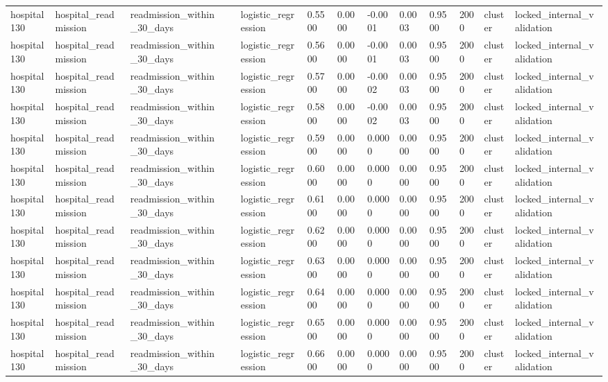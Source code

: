 \begin{tabular}{lllllllllllll}
hospital130 & hospital\_readmission & readmission\_within\_30\_days &  & logistic\_regression & 0.5500 & 0.0000 & -0.0001 & 0.0003 & 0.9500 & 2000 & cluster & locked\_internal\_validation \\
hospital130 & hospital\_readmission & readmission\_within\_30\_days &  & logistic\_regression & 0.5600 & 0.0000 & -0.0001 & 0.0003 & 0.9500 & 2000 & cluster & locked\_internal\_validation \\
hospital130 & hospital\_readmission & readmission\_within\_30\_days &  & logistic\_regression & 0.5700 & 0.0000 & -0.0002 & 0.0003 & 0.9500 & 2000 & cluster & locked\_internal\_validation \\
hospital130 & hospital\_readmission & readmission\_within\_30\_days &  & logistic\_regression & 0.5800 & 0.0000 & -0.0002 & 0.0003 & 0.9500 & 2000 & cluster & locked\_internal\_validation \\
hospital130 & hospital\_readmission & readmission\_within\_30\_days &  & logistic\_regression & 0.5900 & 0.0000 & 0.0000 & 0.0000 & 0.9500 & 2000 & cluster & locked\_internal\_validation \\
hospital130 & hospital\_readmission & readmission\_within\_30\_days &  & logistic\_regression & 0.6000 & 0.0000 & 0.0000 & 0.0000 & 0.9500 & 2000 & cluster & locked\_internal\_validation \\
hospital130 & hospital\_readmission & readmission\_within\_30\_days &  & logistic\_regression & 0.6100 & 0.0000 & 0.0000 & 0.0000 & 0.9500 & 2000 & cluster & locked\_internal\_validation \\
hospital130 & hospital\_readmission & readmission\_within\_30\_days &  & logistic\_regression & 0.6200 & 0.0000 & 0.0000 & 0.0000 & 0.9500 & 2000 & cluster & locked\_internal\_validation \\
hospital130 & hospital\_readmission & readmission\_within\_30\_days &  & logistic\_regression & 0.6300 & 0.0000 & 0.0000 & 0.0000 & 0.9500 & 2000 & cluster & locked\_internal\_validation \\
hospital130 & hospital\_readmission & readmission\_within\_30\_days &  & logistic\_regression & 0.6400 & 0.0000 & 0.0000 & 0.0000 & 0.9500 & 2000 & cluster & locked\_internal\_validation \\
hospital130 & hospital\_readmission & readmission\_within\_30\_days &  & logistic\_regression & 0.6500 & 0.0000 & 0.0000 & 0.0000 & 0.9500 & 2000 & cluster & locked\_internal\_validation \\
hospital130 & hospital\_readmission & readmission\_within\_30\_days &  & logistic\_regression & 0.6600 & 0.0000 & 0.0000 & 0.0000 & 0.9500 & 2000 & cluster & locked\_internal\_validation \\

\end{tabular}
